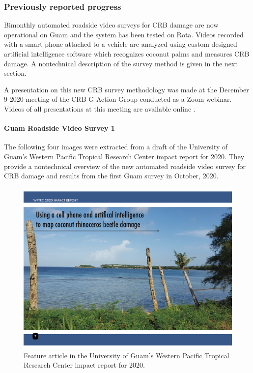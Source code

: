 \documentclass[12pt,letterpaper,english,bibliography=totocnumbered, abstract=on]{scrartcl}
\begin{document}
\subsubsection{Previously reported progress}

Bimonthly automated roadside video surveys for CRB damage are now operational on Guam and the system has been tested on Rota. Videos recorded with a smart phone attached to a vehicle are analyzed using custom-designed artificial intelligence software which recognizes coconut palms and measures CRB damage. A nontechnical description of the survey method is given in the next section.

A presentation on this new CRB survey methodology was made at the December 9 2020 meeting of the CRB-G Action Group conducted as a Zoom webinar. Videos of all presentations at this meeting are available online \cite{mooreVideoRecordingCRBG2020}.

\clearpage
\paragraph{Guam Roadside Video Survey 1}

The following four images were extracted from a draft of the University of Guam's Western Pacific Tropical Research Center impact report for 2020. They provide a nontechnical overview of the new automated roadside video survey for CRB damage and results from the first Guam survey in October, 2020.

\begin{figure}[h]
	\centering
	\includegraphics[width=1\linewidth]{images/impact-report07.png}
	\caption{Feature article in the University of Guam's Western Pacific Tropical Research Center impact report for 2020.}
	\label{fig:roadside1-1}
\end{figure}
\end{document}
